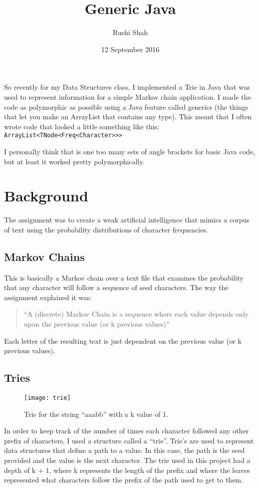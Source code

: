 \documentclass[12pt]{article}
\title{Generic Java}
\author{Rushi Shah}
\date{12 September 2016}
\begin{document}
  \maketitle

  So recently for my Data Structures class, I implemented a Trie in Java that was used to represent information for a simple Markov chain application. I made the code as polymorphic as possible using a Java feature called generics (the things that let you make an ArrayList that contains any type). This meant that I often wrote code that looked a little something like this: \texttt{ArrayList<TNode<Freq<Character>{}>{}>}

  I personally think that is one too many sets of angle brackets for basic Java code, but at least it worked pretty polymorphically.

  \section{Background}
    The assignment was to create a weak artificial intelligence that mimics a corpus of text using the probability distributions of character frequencies. 

    \subsection{Markov Chains}
      This is basically a Markov chain over a text file that examines the probability that any character will follow a sequence of seed characters. The way the assignment explained it was: 

      \begin{quotation}
        ``A (discrete) Markov Chain is a sequence where each value depends only upon the previous value (or k previous values)''
      \end{quotation}

      Each letter of the resulting text is just dependent on the previous value (or k previous values).

    \subsection{Tries}
      \begin{figure}
        \centering
        \texttt{[image: trie]}
        \caption{Trie for the string ``aaabb'' with a k value of 1.}
      \end{figure}
      In order to keep track of the number of times each character followed any other prefix of characters, I used a structure called a ``trie''. Trie's are used to represent data structures that define a path to a value. In this case, the path is the seed provided and the value is the next character. The trie used in this project had a depth of k + 1, where k represents the length of the prefix and where the leaves represented what characters follow the prefix of the path used to get to them.
\end{document}
